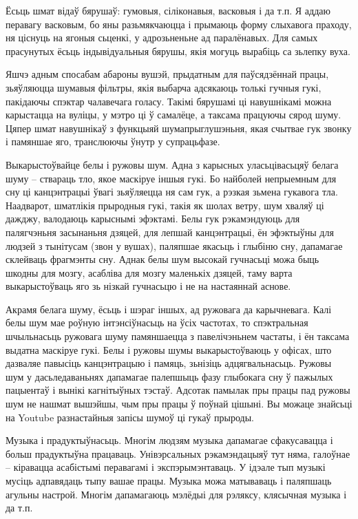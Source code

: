 Ёсьць шмат відаў бярушаў: гумовыя, сіліконавыя, васковыя і да т.п. Я аддаю перавагу васковым, бо яны разьмякчаюцца і прымаюць форму слыхавога праходу, ня ціснуць на ягоныя сьценкі, у адрозьненьне ад паралёнавых. Для самых прасунутых ёсьць індывідуальныя бярушы, якія могуць вырабіць са зьлепку вуха.

Яшчэ адным спосабам абароны вушэй, прыдатным для паўсядзённай працы, зьяўляюцца шумавыя фільтры, якія выбарча адсякаюць толькі гучныя гукі, пакідаючы спэктар чалавечага голасу. Такімі бярушамі ці навушнікамі можна карыстацца на вуліцы, у мэтро ці ў самалёце, а таксама працуючы сярод шуму. Цяпер шмат навушнікаў з функцыяй шумапрыглушэньня, якая счытвае гук звонку і памяншае яго, транслюючы ўнутр у супрацьфазе.

Выкарыстоўвайце белы і ружовы шум. Адна з карысных уласьцівасьцяў белага шуму – ствараць тло, якое маскіруе іншыя гукі. Бо найболей непрыемным для сну ці канцэнтрацыі ўвагі зьяўляецца ня сам гук, а рэзкая зьмена гукавога тла. Наадварот, шматлікія прыродныя гукі, такія як шолах ветру, шум хваляў ці дажджу, валодаюць карыснымі эфэктамі. Белы гук рэкамэндуюць для палягчэньня засынаньня дзяцей, для лепшай канцэнтрацыі, ён эфэктыўны для людзей з тынітусам (звон у вушах), паляпшае якасьць і глыбіню сну, дапамагае склейваць фрагмэнты сну. Аднак белы шум высокай гучнасьці можа быць шкодны для мозгу, асабліва для мозгу маленькіх дзяцей, таму варта выкарыстоўваць яго зь нізкай гучнасьцю і не на настаяннай аснове.

Акрамя белага шуму, ёсьць і шэраг іншых, ад ружовага да карычневага. Калі белы шум мае роўную інтэнсіўнасьць на ўсіх частотах, то спэктральная шчыльнасьць ружовага шуму памяншаецца з павелічэньнем частаты, і ён таксама выдатна маскіруе гукі. Белы і ружовы шумы выкарыстоўваюць у офісах, што дазваляе павысіць канцэнтрацыю і памяць, зьнізіць адцягвальнасьць. Ружовы шум у дасьледаваньнях дапамагае палепшыць фазу глыбокага сну ў пажылых пацыентаў і вынікі кагнітыўных тэстаў. Адсотак памылак пры працы пад ружовы шум не нашмат вышэйшы, чым пры працы ў поўнай цішыні. Вы можаце знайсьці на Youtube разнастайныя запісы шумоў ці гукаў прыроды.

Музыка і прадуктыўнасьць. Многім людзям музыка дапамагае сфакусавацца і больш прадуктыўна працаваць. Унівэрсальных рэкамэндацыяў тут няма, галоўнае – кіравацца асабістымі перавагамі і экспэрымэнтаваць. У ідэале тып музыкі мусіць адпавядаць тыпу вашае працы. Музыка можа матываваць і паляпшаць агульны настрой. Многім дапамагаюць мэлёдыі для рэляксу, клясычная музыка і да т.п.

